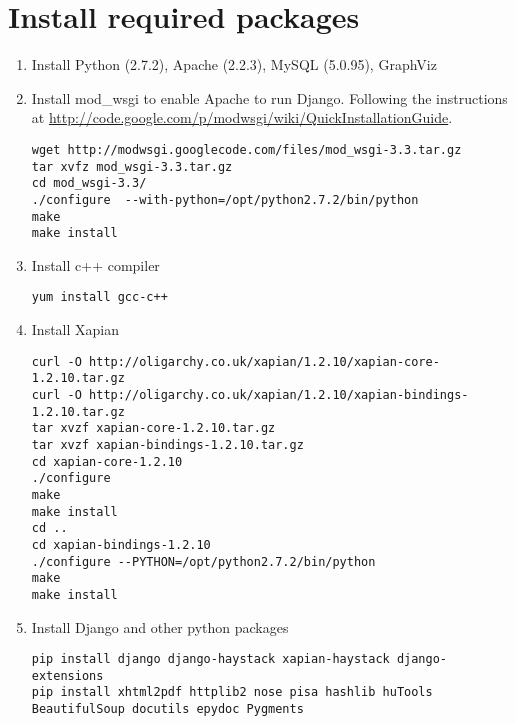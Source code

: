 \documentclass[twoside]{book}
\begin{document}
\section{Install required packages}
\begin{enumerate}
\item Install Python (2.7.2), Apache (2.2.3), MySQL (5.0.95), GraphViz
	
\item Install mod\_wsgi to enable Apache to run Django. Following the instructions at \url{http://code.google.com/p/modwsgi/wiki/QuickInstallationGuide}.
\begin{verbatim}
wget http://modwsgi.googlecode.com/files/mod_wsgi-3.3.tar.gz
tar xvfz mod_wsgi-3.3.tar.gz
cd mod_wsgi-3.3/
./configure  --with-python=/opt/python2.7.2/bin/python
make
make install
\end{verbatim}
	
\item Install c++ compiler
\begin{verbatim}
yum install gcc-c++
\end{verbatim}
  
\item Install Xapian
\begin{verbatim}
curl -O http://oligarchy.co.uk/xapian/1.2.10/xapian-core-1.2.10.tar.gz
curl -O http://oligarchy.co.uk/xapian/1.2.10/xapian-bindings-1.2.10.tar.gz
tar xvzf xapian-core-1.2.10.tar.gz
tar xvzf xapian-bindings-1.2.10.tar.gz
cd xapian-core-1.2.10
./configure
make
make install
cd ..
cd xapian-bindings-1.2.10
./configure --PYTHON=/opt/python2.7.2/bin/python
make
make install
\end{verbatim}
		
\item Install Django and other python packages
\begin{verbatim}
pip install django django-haystack xapian-haystack django-extensions
pip install xhtml2pdf httplib2 nose pisa hashlib huTools BeautifulSoup docutils epydoc Pygments
\end{verbatim}


\end{enumerate}
\end{document}
